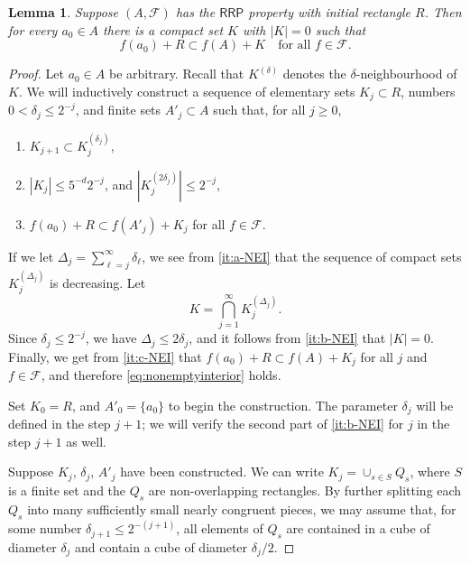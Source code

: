 \documentclass[12pt]{amsart}
\newtheorem{lemma}[theorem]{Lemma}
\newcommand{\RRP}{\mathsf{RRP}}
\numberwithin{theorem}{section}
\numberwithin{equation}{section}
\begin{document}
\begin{lemma} \label{lem:nonemptyinterior}
    Suppose $(A,\mathcal{F})$ has the $\RRP$ property with initial rectangle $R$. Then for every $a_0\in A$ there is a compact set $K$ with $|K|=0$ such that
    \begin{equation} \label{eq:nonemptyinterior}
        f(a_0)+R\subset f(A)+K \quad\text{for all } f\in\mathcal{F}.
    \end{equation}
\end{lemma}
\begin{proof}

    Let $a_0\in A$ be arbitrary. Recall that $K^{(\delta)}$ denotes the $\delta$-neighbourhood of $K$. We will inductively construct a sequence of elementary sets $K_j\subset R$, numbers $0<\delta_j\le 2^{-j}$, and finite sets $A'_j\subset A$ such that, for all $j\ge 0$,
    \begin{enumerate}[label=(\alph*)]
        \item \label{it:a-NEI} $K_{j+1}\subset K_j^{(\delta_j)}$,
        \item \label{it:b-NEI} $|K_{j}|\le 5^{-d} 2^{-j}$, and $\displaystyle{\left|K_{j}^{(2\delta_j)}\right|\le  2^{-j}}$,
        \item \label{it:c-NEI} $f(a_0) +R\subset f(A'_j)+K_j$ for all $f\in\mathcal{F}$.
    \end{enumerate}
    If we let $\Delta_{j}=\sum_{\ell=j}^\infty\delta_{\ell}$, we see from \ref{it:a-NEI} that the sequence of compact sets $K_j^{(\Delta_j)}$ is decreasing. Let
    \[
        K = \bigcap_{j=1}^\infty K_j^{(\Delta_j)}.
    \]
    Since $\delta_j\le 2^{-j}$, we have $\Delta_j\le 2\delta_j$, and it follows from \ref{it:b-NEI} that $|K|=0$. Finally, we get from \ref{it:c-NEI} that $f(a_0)+R \subset f(A)+K_j$ for all $j$ and $f\in\mathcal{F}$, and therefore \eqref{eq:nonemptyinterior} holds.

    Set $K_0=R$, and $A'_0=\{a_0\}$ to begin the construction. The parameter $\delta_j$ will be defined in the step $j+1$; we will verify the second part of \ref{it:b-NEI} for $j$ in the step $j+1$ as well.

    Suppose $K_j$, $\delta_j$, $A'_j$ have been constructed. We can write $K_j= \cup_{s\in S} Q_s$, where $S$ is a finite set and the $Q_s$ are non-overlapping rectangles. By further splitting each $Q_s$ into many sufficiently small nearly congruent pieces, we may assume that, for some number $\delta_{j+1}\le 2^{-(j+1)}$, all elements of $Q_s$ are contained in a cube of diameter $\delta_{j}$ and contain a cube of diameter $\delta_{j}/2$.


\end{proof}
\end{document}
